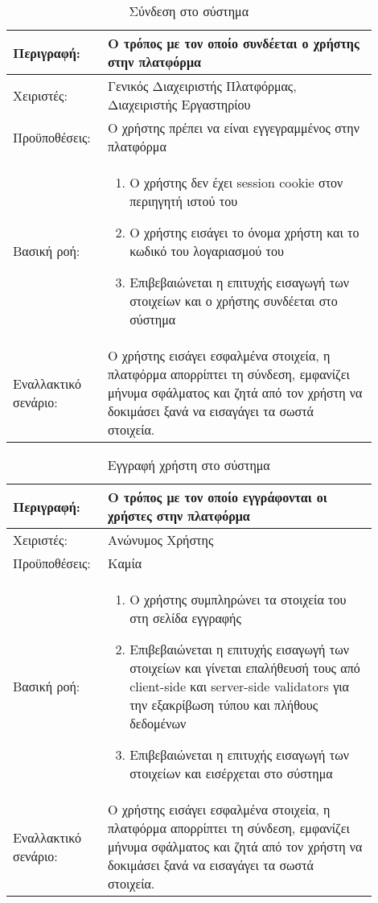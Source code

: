 \begin{table}[h]
	\caption{Σύνδεση στο σύστημα}
	\label{tab:use-case-login}
	\begin{tabular}{|p{0.2\linewidth}|p{0.7\linewidth}|}
		\hline
		Περιγραφή: & Ο τρόπος με τον οποίο συνδέεται ο χρήστης στην πλατφόρμα \\ \hline
		Χειριστές: & Γενικός Διαχειριστής Πλατφόρμας, Διαχειριστής Εργαστηρίου \\ \hline
		Προϋποθέσεις: & Ο χρήστης πρέπει να είναι εγγεγραμμένος στην πλατφόρμα \\ \hline
		Βασική ροή: & 
		\begin{enumerate}
			\item Ο χρήστης δεν έχει session cookie στον περιηγητή ιστού του
			\item Ο χρήστης εισάγει το όνομα χρήστη και το κωδικό του λογαριασμού του
			\item Επιβεβαιώνεται η επιτυχής εισαγωγή των στοιχείων και ο χρήστης συνδέεται στο σύστημα
		\end{enumerate} \\ \hline
		Εναλλακτικό σενάριο: & O χρήστης εισάγει εσφαλμένα στοιχεία, η πλατφόρμα απορρίπτει τη σύνδεση, εμφανίζει μήνυμα σφάλματος και ζητά από τον χρήστη να δοκιμάσει ξανά να εισαγάγει τα σωστά στοιχεία. \\ \hline
	\end{tabular}
\end{table}

\begin{table}[h]
	\caption{Εγγραφή χρήστη στο σύστημα}
	\label{tab:use-case-register}
	\begin{tabular}{|p{0.2\linewidth}|p{0.7\linewidth}|}
		\hline
		Περιγραφή: & Ο τρόπος με τον οποίο εγγράφονται οι χρήστες στην πλατφόρμα \\ \hline
		Χειριστές: & Ανώνυμος Χρήστης \\ \hline
		Προϋποθέσεις: & Καμία \\ \hline
		Βασική ροή: & 
		\begin{enumerate}
			\item Ο χρήστης συμπληρώνει τα στοιχεία του στη σελίδα εγγραφής
			\item Επιβεβαιώνεται η επιτυχής εισαγωγή των στοιχείων και γίνεται επαλήθευσή τους από client-side και server-side validators για την εξακρίβωση τύπου και πλήθους δεδομένων
			\item Επιβεβαιώνεται η επιτυχής εισαγωγή των στοιχείων και εισέρχεται στο σύστημα
		\end{enumerate} \\ \hline
		Εναλλακτικό σενάριο: & O χρήστης εισάγει εσφαλμένα στοιχεία, η πλατφόρμα απορρίπτει τη σύνδεση, εμφανίζει μήνυμα σφάλματος και ζητά από τον χρήστη να δοκιμάσει ξανά να εισαγάγει τα σωστά στοιχεία.                     \\ \hline
	\end{tabular}
\end{table}


